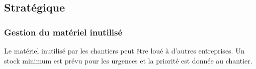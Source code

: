 \subsection{Stratégique}
\subsubsection{Gestion du matériel inutilisé}

Le matériel inutilisé par les chantiers peut être loué à d’autres entreprises.
Un stock minimum est prévu pour les urgences et la priorité est donnée au chantier.
